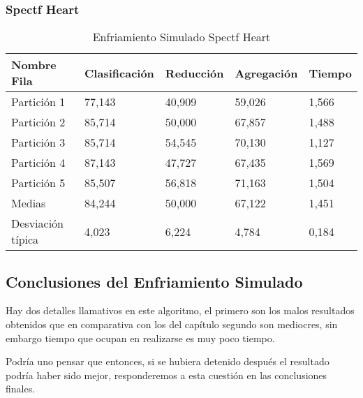 \subsubsection{Spectf Heart}
\begin{table}[H]
  \centering
  \caption{Enfriamiento Simulado Spectf Heart}
  \begin{tabular}{|l|l|l|l|l|}
  \hline
      Nombre Fila & Clasificación & Reducción & Agregación & Tiempo \\ \hline
      Partición 1 & 77,143 & 40,909 & 59,026 & 1,566 \\ \hline
      Partición 2 & 85,714 & 50,000 & 67,857 & 1,488 \\ \hline
      Partición 3 & 85,714 & 54,545 & 70,130 & 1,127 \\ \hline
      Partición 4 & 87,143 & 47,727 & 67,435 & 1,569 \\ \hline
      Partición 5 & 85,507 & 56,818 & 71,163 & 1,504 \\ \hline
      Medias  & 84,244 & 50,000 & 67,122 & 1,451 \\ \hline
      Desviación típica & 4,023 & 6,224 & 4,784 & 0,184 \\ \hline
  \end{tabular}
  \label{enfriamiento-simulado-heart}
\end{table}

\subsection{Conclusiones del Enfriamiento Simulado}  

Hay dos detalles llamativos en este algoritmo, el primero son 
los malos resultados obtenidos que en comparativa con los
del capítulo segundo son  mediocres, sin embargo
tiempo que ocupan en realizarse es muy poco tiempo.

Podría uno pensar que entonces, si se hubiera detenido después el resultado podría haber sido mejor, responderemos a esta cuestión en las conclusiones finales. 
